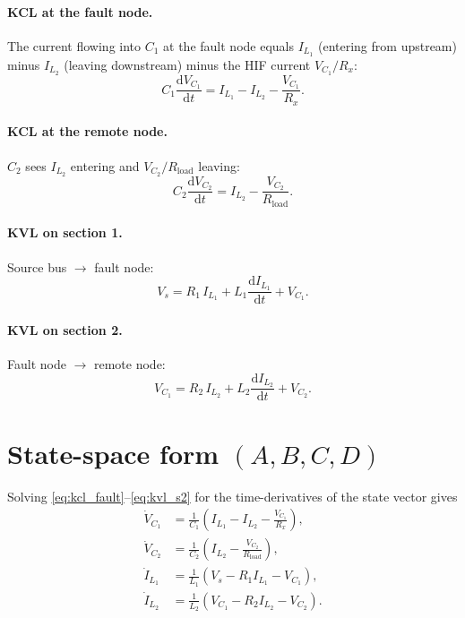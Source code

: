 \documentclass[11pt,a4paper]{article}
\begin{document}
\paragraph{KCL at the fault node.}
The current flowing into $C_1$ at the fault node equals
$I_{L_1}$ (entering from upstream) minus $I_{L_2}$ (leaving downstream)
minus the HIF current $V_{C_1}/R_x$:
\begin{equation}
  C_1\frac{\mathrm{d}V_{C_1}}{\mathrm{d}t}
    = I_{L_1} - I_{L_2} - \frac{V_{C_1}}{R_x}.
  \label{eq:kcl_fault}
\end{equation}

\paragraph{KCL at the remote node.}
$C_2$ sees $I_{L_2}$ entering and $V_{C_2}/R_{\text{load}}$ leaving:
\begin{equation}
  C_2\frac{\mathrm{d}V_{C_2}}{\mathrm{d}t}
    = I_{L_2} - \frac{V_{C_2}}{R_{\text{load}}}.
  \label{eq:kcl_remote}
\end{equation}

\paragraph{KVL on section 1.}
Source bus $\to$ fault node:
\begin{equation}
  V_s = R_1\, I_{L_1} + L_1\frac{\mathrm{d}I_{L_1}}{\mathrm{d}t} + V_{C_1}.
  \label{eq:kvl_s1}
\end{equation}

\paragraph{KVL on section 2.}
Fault node $\to$ remote node:
\begin{equation}
  V_{C_1} = R_2\, I_{L_2} + L_2\frac{\mathrm{d}I_{L_2}}{\mathrm{d}t} + V_{C_2}.
  \label{eq:kvl_s2}
\end{equation}

\section{State-space form $(A, B, C, D)$}\label{sec:stateSpace}

Solving \eqref{eq:kcl_fault}--\eqref{eq:kvl_s2} for the time-derivatives
of the state vector gives
\begin{align}
  \dot V_{C_1} &= \frac{1}{C_1}\!\left(I_{L_1} - I_{L_2}
                                       - \tfrac{V_{C_1}}{R_x}\right), \\
  \dot V_{C_2} &= \frac{1}{C_2}\!\left(I_{L_2}
                                       - \tfrac{V_{C_2}}{R_{\text{load}}}\right), \\
  \dot I_{L_1} &= \frac{1}{L_1}\!\left(V_s - R_1 I_{L_1} - V_{C_1}\right), \\
  \dot I_{L_2} &= \frac{1}{L_2}\!\left(V_{C_1} - R_2 I_{L_2} - V_{C_2}\right).
\end{align}
\end{document}
